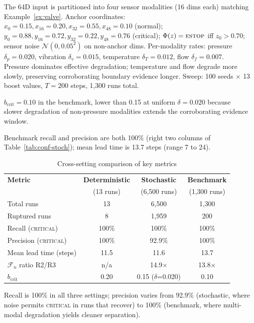 \documentclass{llncs}
\newcommand{\st}[1]{\textup{\textsc{#1}}}
\begin{document}
The 64D input is partitioned into four sensor modalities (16 dims each)
matching Example~\ref{ex:valve}. Anchor coordinates: $x_0 = 0.15,
x_{16} = 0.20, x_{32} = 0.55, x_{48} = 0.10$ (normal); $y_0 = 0.88,
y_{16} = 0.72, y_{32} = 0.22, y_{48} = 0.76$ (critical); $\Phi(z) =
\st{estop}$ iff $z_0 > 0.70$; sensor noise $\mathcal{N}(0, 0.05^2)$ on
non-anchor dims. Per-modality rates: pressure $\delta_p = 0.020$,
vibration $\delta_v = 0.015$, temperature $\delta_T = 0.012$, flow
$\delta_f = 0.007$. Pressure dominates effective degradation; temperature
and flow degrade more slowly, preserving corroborating boundary evidence
longer. Sweep: 100 seeds $\times$ 13 boost values, $T = 200$ steps,
1,300 runs total.

\begin{observation}
$b_{\mathrm{crit}} = 0.10$ in the benchmark, lower than 0.15 at uniform
$\delta = 0.020$ because slower degradation of non-pressure modalities
extends the corroborating evidence window.
\end{observation}

Benchmark recall and precision are both 100\% (right two columns of
Table~\ref{tab:conf-stoch}); mean lead time is 13.7 steps (range 7 to
24).

\begin{table}[H]
\centering
\caption{Cross-setting comparison of key metrics}
\label{tab:comparison}
\small
\begin{tabular}{lccc}
\toprule
\textbf{Metric} & \textbf{Deterministic} & \textbf{Stochastic} & \textbf{Benchmark} \\
 & (13 runs) & (6,500 runs) & (1,300 runs) \\
\midrule
Total runs            & 13    & 6,500   & 1,300 \\
Ruptured runs         & 8     & 1,959   & 200 \\
Recall (\st{critical}) & 100\% & 100\% & 100\% \\
Precision (\st{critical}) & 100\% & 92.9\% & 100\% \\
Mean lead time (steps) & 11.5 & 11.6 & 13.7 \\
$\mathcal{F}_n$ ratio R2/R3 & n/a & 14.9$\times$ & 13.8$\times$ \\
$b_{\mathrm{crit}}$ & 0.20 & 0.15 ($\delta$=0.020) & 0.10 \\
\bottomrule
\end{tabular}
\end{table}

\begin{observation}
Recall is 100\% in all three settings; precision varies from 92.9\%
(stochastic, where noise permits \st{critical} in runs that recover)
to 100\% (benchmark, where multi-modal degradation yields cleaner
separation).
\end{observation}
\end{document}
